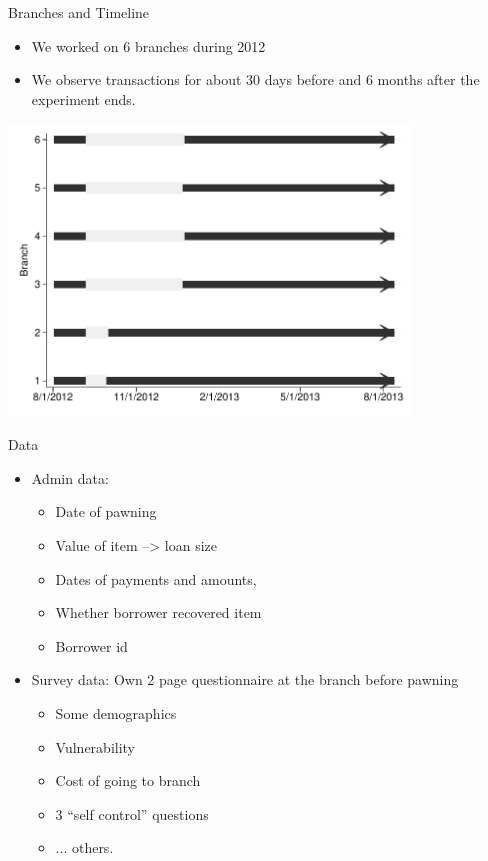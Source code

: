 \documentclass[9pt]{beamer}
\begin{document}
\begin{frame}{Branches and Timeline}
    \begin{itemize}
        \item We worked on 6 branches during 2012
        \item We observe transactions for about 30 days before and 6 months after the experiment ends.
    \end{itemize}
    \begin{center}
        \includegraphics[width=0.80\textwidth]{Figuras/timeline_suc_exp_extended.pdf}
    \end{center}
\end{frame}


\begin{frame}{Data}

\begin{itemize}
    \item Admin data:
    \begin{itemize}
        \item Date of pawning
        \item Value of item --> loan size
        \item Dates of payments and amounts, 
        \item Whether borrower recovered item
        \item Borrower id
    \end{itemize}
    \vfill
    \item Survey data: Own 2 page questionnaire at the branch before pawning
    \begin{itemize}
        \item Some demographics
        \item Vulnerability
        \item Cost of going to branch
        \item 3 ``self control'' questions
        \item ... others.
    \end{itemize}
\end{itemize}
    
\end{frame}
\end{document}
